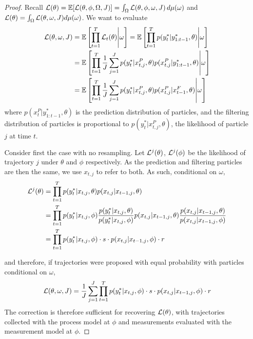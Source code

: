 \documentclass{article}
\begin{document}
\begin{proof}
    Recall $\mathcal{L}(\theta) = \mathbb{E}[\mathcal{L}(\theta,\phi,\Omega, J)]=\int_\Omega \mathcal{L}(\theta,\phi,\omega, J)\, d\mu(\omega)$ and $\mathcal{L}(\theta) = \int_\Omega \mathcal{L}(\theta, \omega, J) d\mu(\omega)$. We want to evaluate
    \begin{align*}
        \mathcal{L}(\theta,\omega, J)
        &= \mathbb{E}\left[ \prod_{t=1}^T \mathcal{L}_t(\theta) \middle| \omega\right]
        = \mathbb{E}\left[ \prod_{t=1}^T p(y_t^*|y_{1:t-1}^*,\theta) \middle| \omega\right] \\
        &= \mathbb{E}\left[ \prod_{t=1}^T \frac{1}{J} \sum_{j=1}^J  p(y_t^*|x_{t,j}^P,\theta) p(x_{t,j}^P|y_{1:t-1}^*,\theta) \middle| \omega\right] \\
        &= \mathbb{E}\left[ \prod_{t=1}^T\frac{1}{J}  \sum_{j=1}^J  p(y_t^*|x_{t,j}^P,\theta) p(x_{t,j}^P|x_{t-1}^F,\theta) \middle| \omega\right] 
    \end{align*}
    where $p(x_t^P|y_{1:t-1}^*,\theta)$ is the prediction distribution of particles, and the filtering distribution of particles is proportional to $p(y_t^*|x_{t,j}^P,\theta)$, the likelihood of particle $j$ at time $t$.
    
    Consider first the case with no resampling. Let $\mathcal{L}^j(\theta)$, $\mathcal{L}^j(\phi)$ be the likelihood of trajectory $j$ under $\theta$ and $\phi$ respectively. As the prediction and filtering particles are then the same, we use $x_{t,j}$ to refer to both. As such, conditional on $\omega$,
    \begin{align*}
        \mathcal{L}^j(\theta) 
        &= \prod_{t=1}^T p(y_t^*|x_{t,j}, \theta) p(x_{t,j}|x_{t-1,j}, \theta) \\
        &= \prod_{t=1}^T p(y_t^*|x_{t,j}, \phi) \frac{p(y_t^*|x_{t,j}, \theta)}{p(y_t^*|x_{t,j}, \phi)} p(x_{t,j}|x_{t-1,j}, \theta) \frac{p(x_{t,j}|x_{t-1,j}, \theta) }{p(x_{t,j}|x_{t-1,j}, \phi) } \\
        &= \prod_{t=1}^T p(y_t^*|x_{t,j}, \phi) \cdot s \cdot p(x_{t,j}|x_{t-1,j}, \phi)\cdot r
    \end{align*}
    
    and therefore, if trajectories were proposed with equal probability with particles conditional on $\omega$,
    $$ \mathcal{L}(\theta, \omega, J) = \frac{1}{J} \sum_{j=1}^J \prod_{t=1}^T p(y_t^*|x_{t,j}, \phi) \cdot s \cdot p(x_{t,j}|x_{t-1,j}, \phi)\cdot r $$
    The correction is therefore sufficient for recovering $\mathcal{L}(\theta)$, with trajectories collected with the process model at $\phi$ and measurements evaluated with the measurement model at $\phi$. 
    

\end{proof}
\end{document}
